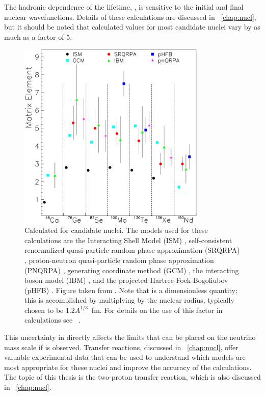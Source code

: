 The hadronic dependence of the lifetime, \NME, is sensitive to the initial and final nuclear wavefunctions.  Details of these calculations are discussed in {\chap}~\ref{chap:nucl}, but it should be noted that calculated \NME values for most candidate nuclei vary by as much as a factor of 5.
\begin{figure}[htp]
\centering
\includegraphics[width=0.8\textwidth]{figures/differentNME.eps}
\caption[Uncertainty in current calculated values of \NME.]{Calculated \NME for candidate \zvbb nuclei.  The models used for these calculations are the Interacting Shell Model (ISM) \citep{ISM}, self-consistent renormalized quasi-particle random phase approximation (SRQRPA) \citep{FaesslerReview}, proton-neutron quasi-particle random phase approximation (PNQRPA) \citep{pnQRPA_Suhonen}, generating coordinate method (GCM) \citep{GCM}, the interacting boson model (IBM) \citep{IBM_Iachello}, and the projected Hartree-Fock-Bogoliubov (pHFB) \citep{pHFB}.  Figure taken from \citep{zvbbReviewSchwingenheuer}.  Note that \NME is a dimensionless quantity; this is accomplished by multiplying by the nuclear radius, typically chosen to be $1.2A^{1/3}$~fm.  For details on the use of this factor in \NME calculations see {}~\citep{scalingFactorNME}.}
\label{fig:differentNME}
\end{figure}  
This uncertainty in \NME directly affects the limits that can be placed on the neutrino mass scale if \zvbb is observed.  Transfer reactions, discussed in {\chap}~\ref{chap:nucl}, offer valuable experimental data that can be used to understand which models are most appropriate for these nuclei and improve the accuracy of the calculations.  The topic of this thesis is the two-proton transfer reaction, which is also discussed in {\chap}~\ref{chap:nucl}.

